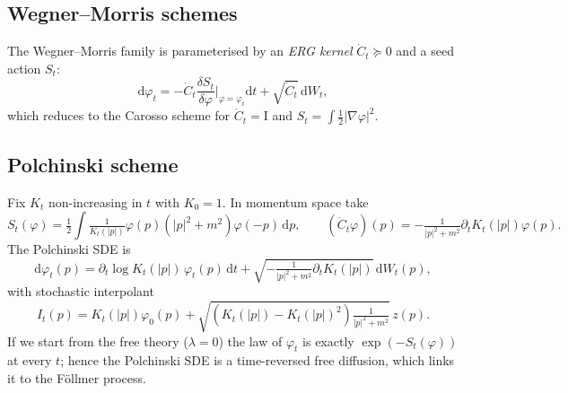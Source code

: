 \documentclass[11pt]{amsart}
\newcommand{\rd}{\mathrm{d}}
\theoremstyle{remark}
\numberwithin{equation}{section}
\begin{document}
\subsection{Wegner--Morris schemes}
The Wegner--Morris family is parameterised by an \emph{ERG kernel} $\dot C_t\succeq 0$ and a seed action $S_t$:
\begin{equation}
 \rd\varphi_t = -\dot C_t\frac{\delta S_t}{\delta\varphi}\Big|_{\varphi=\varphi_t}\rd t + \sqrt{\dot C_t}\,\rd W_t,
\end{equation}
which reduces to the Carosso scheme for $\dot C_t=\mathrm{I}$ and $S_t=\int\tfrac12|\nabla\varphi|^2$.

\subsection{Polchinski scheme}
Fix $K_t$ non-increasing in $t$ with $K_0=1$. In momentum space take
\begin{equation}
 S_t(\varphi) = \tfrac12\int\tfrac{1}{K_t(|p|)}\varphi(p)(|p|^2+m^2)\varphi(-p)\,\rd p,\qquad (\dot C_t\varphi)(p) = -\tfrac{1}{|p|^2+m^2}\partial_t K_t(|p|)\varphi(p).
\end{equation}
The Polchinski SDE is
\begin{equation}
 \rd\varphi_t(p) = \partial_t\log K_t(|p|)\,\varphi_t(p)\,\rd t + \sqrt{-\tfrac{1}{|p|^2+m^2}\partial_t K_t(|p|)}\,\rd W_t(p),
\end{equation}
with stochastic interpolant
\begin{equation}
 I_t(p) = K_t(|p|)\varphi_0(p) + \sqrt{(K_t(|p|)-K_t(|p|)^2)\tfrac{1}{|p|^2+m^2}}\,z(p).
\end{equation}
If we start from the free theory ($\lambda=0$) the law of $\varphi_t$ is exactly $\exp(-S_t(\varphi))$ at every $t$; hence the Polchinski SDE is a time-reversed free diffusion, which links it to the F\"ollmer process.
\end{document}
